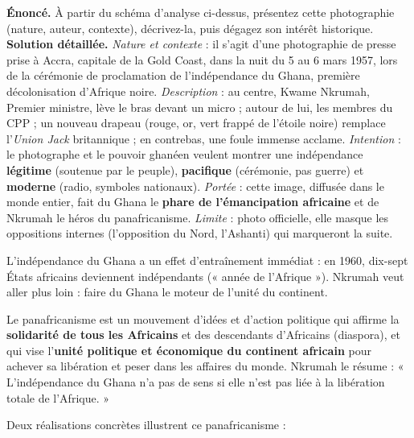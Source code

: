 \documentclass[11pt]{article}
\newcommand{\cle}[1]{{\popxbold\color{popdark}#1}}
\newcounter{popsec}
\newcounter{popsub}
\newcommand{\courssub}[1]{%
  \stepcounter{popsub}%
  \par\vspace{9pt}\noindent{\popxbold\fontsize{11.5}{13}\selectfont\color{popink}{\color{poporange}\thepopsec.\thepopsub}\hspace{6pt}#1}\par\nopagebreak\vspace{4pt}
}
\begin{document}
\begin{exoresolu}
\textbf{Énoncé.} À partir du schéma d'analyse ci-dessus, présentez cette photographie (nature, auteur, contexte), décrivez-la, puis dégagez son intérêt historique.
\tcblower
\textbf{Solution détaillée.} \emph{Nature et contexte} : il s'agit d'une photographie de presse prise à Accra, capitale de la Gold Coast, dans la nuit du 5 au 6 mars 1957, lors de la cérémonie de proclamation de l'indépendance du Ghana, première décolonisation d'Afrique noire. \emph{Description} : au centre, Kwame Nkrumah, Premier ministre, lève le bras devant un micro ; autour de lui, les membres du CPP ; un nouveau drapeau (rouge, or, vert frappé de l'étoile noire) remplace l'\emph{Union Jack} britannique ; en contrebas, une foule immense acclame. \emph{Intention} : le photographe et le pouvoir ghanéen veulent montrer une indépendance \textbf{légitime} (soutenue par le peuple), \textbf{pacifique} (cérémonie, pas guerre) et \textbf{moderne} (radio, symboles nationaux). \emph{Portée} : cette image, diffusée dans le monde entier, fait du Ghana le \textbf{phare de l'émancipation africaine} et de Nkrumah le héros du panafricanisme. \emph{Limite} : photo officielle, elle masque les oppositions internes (l'opposition du Nord, l'Ashanti) qui marqueront la suite.
\end{exoresolu}

\courssub{Le Ghana, phare du panafricanisme}

L'indépendance du Ghana a un effet d'entraînement immédiat : en 1960, dix-sept États africains deviennent indépendants (« année de l'Afrique »). Nkrumah veut aller plus loin : faire du Ghana le moteur de l'unité du continent.

\begin{definition}[Panafricanisme]
Le \cle{panafricanisme} est un mouvement d'idées et d'action politique qui affirme la \textbf{solidarité de tous les Africains} et des descendants d'Africains (diaspora), et qui vise l'\textbf{unité politique et économique du continent africain} pour achever sa libération et peser dans les affaires du monde. Nkrumah le résume : « L'indépendance du Ghana n'a pas de sens si elle n'est pas liée à la libération totale de l'Afrique. »
\end{definition}

Deux réalisations concrètes illustrent ce panafricanisme :
\end{document}
